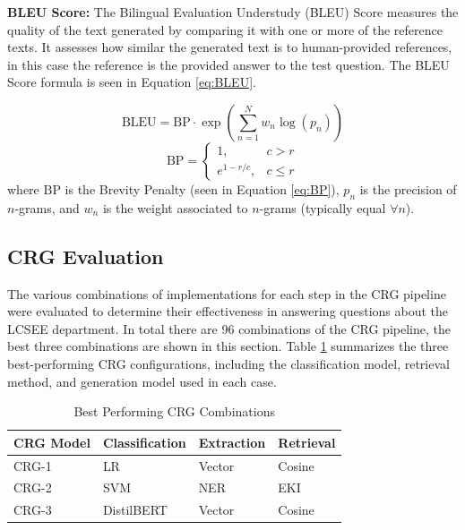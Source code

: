 \documentclass[conference]{IEEEtran}
\begin{document}
\noindent
\textbf{BLEU Score:}
The Bilingual Evaluation Understudy (BLEU) Score measures the quality of the text generated by comparing it with one or more of the reference texts.
It assesses how similar the generated text is to human-provided references, in this case the reference is the provided answer to the test question. 
The BLEU Score formula is seen in Equation \ref{eq:BLEU}.

\begin{equation} \label{eq:BLEU}
    \text{BLEU} = \text{BP} \cdot \exp \left( \sum_{n=1}^{N} w_n \log(p_n) \right)
\end{equation}
\begin{equation} \label{eq:BP}
    \text{BP} = 
    \begin{cases}
        1, & c > r \\
        e^{1 - r/c}, & c \leq r
    \end{cases}
\end{equation}
\noindent
where $\text{BP}$ is the Brevity Penalty (seen in Equation \ref{eq:BP}), $p_n$ is the precision of $n$-grams, and $w_n$ is the weight associated to $n$-grams (typically equal $\forall n$).

\subsection{CRG Evaluation}
The various combinations of implementations for each step in the CRG pipeline were evaluated to determine their effectiveness in answering questions about the LCSEE department.
In total there are 96 combinations of the CRG pipeline, the best three combinations are shown in this section. 
Table \ref{tab:crg_combinations} summarizes the three best-performing CRG configurations, including the classification model, retrieval method, and generation model used in each case.

\begin{table}[!ht]
    \centering
    \caption{Best Performing CRG Combinations}
    \label{tab:crg_combinations}
    \begin{tabular}{l|l|l|l}
        \toprule
        \textbf{CRG Model} & \textbf{Classification} & \textbf{Extraction} & \textbf{Retrieval} \\
        \midrule
        CRG-1 & LR & Vector & Cosine \\
        CRG-2 & SVM & NER & EKI \\
        CRG-3 & DistilBERT & Vector & Cosine \\
        \bottomrule
    \end{tabular}
\end{table}
\end{document}
